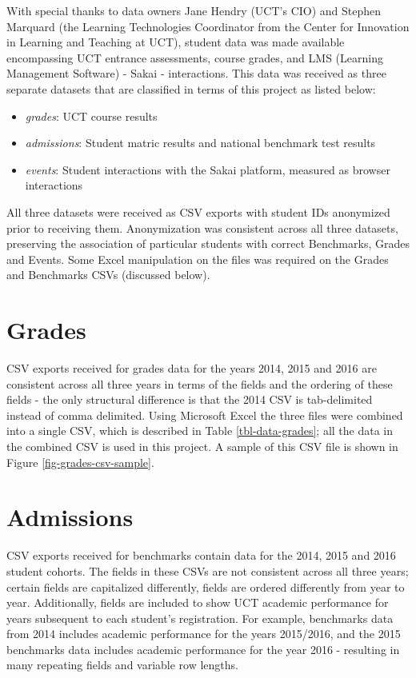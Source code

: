 With special thanks to data owners Jane Hendry (UCT's CIO) and Stephen Marquard (the Learning Technologies Coordinator from the Center for Innovation in Learning and Teaching at UCT), student data was made available encompassing UCT entrance assessments, course grades, and LMS (Learning Management Software) - Sakai \cite{sakai} - interactions. This data was received as three separate datasets that are classified in terms of this project as listed below:

\begin{itemize}
    \item \textit{grades}: UCT course results
    \item \textit{admissions}: Student matric results and national benchmark test results
    \item \textit{events}: Student interactions with the Sakai platform, measured as browser interactions
\end{itemize}

All three datasets were received as CSV exports with student IDs anonymized prior to receiving them. Anonymization was consistent across all three datasets, preserving the association of particular students with correct Benchmarks, Grades and Events. Some Excel manipulation on the files was required on the Grades and Benchmarks CSVs (discussed below).

\section{Grades}
CSV exports received for grades data for the years 2014, 2015 and 2016 are consistent across all three years in terms of the fields and the ordering of these fields - the only structural difference is that the 2014 CSV is tab-delimited instead of comma delimited. Using Microsoft Excel the three files were combined into a single CSV, which is described in Table \ref{tbl-data-grades}; all the data in the combined CSV is used in this project. A sample of this CSV file is shown in Figure \ref{fig-grades-csv-sample}.




\section{Admissions}
CSV exports received for benchmarks contain data for the 2014, 2015 and 2016 student cohorts. The fields in these CSVs are not consistent across all three years; certain fields are capitalized differently, fields are ordered differently from year to year. Additionally, fields are included to show UCT academic performance for years subsequent to each student's registration. For example, benchmarks data from 2014 includes academic performance for the years 2015/2016, and the 2015 benchmarks data includes academic performance for the year 2016 - resulting in many repeating fields and variable row lengths.

